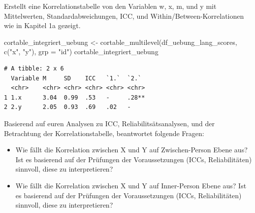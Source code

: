 \documentclass[
  letterpaper,
  DIV=11,
  numbers=noendperiod]{scrreprt}
\newenvironment{Shaded}{\begin{snugshade}}{\end{snugshade}}
\newcommand{\AttributeTok}[1]{\textcolor[rgb]{0.40,0.45,0.13}{#1}}
\newcommand{\FunctionTok}[1]{\textcolor[rgb]{0.28,0.35,0.67}{#1}}
\newcommand{\NormalTok}[1]{\textcolor[rgb]{0.00,0.23,0.31}{#1}}
\newcommand{\OtherTok}[1]{\textcolor[rgb]{0.00,0.23,0.31}{#1}}
\newcommand{\StringTok}[1]{\textcolor[rgb]{0.13,0.47,0.30}{#1}}
\providecommand{\tightlist}{%
  \setlength{\itemsep}{0pt}\setlength{\parskip}{0pt}}\usepackage{longtable,booktabs,array}
\begin{document}
Erstellt eine Korrelationstabelle von den Variablen w, x, m, und y mit
Mittelwerten, Standardabweichungen, ICC, und
Within/Between-Korrelationen wie in Kapitel 1a gezeigt.

\begin{tcolorbox}[enhanced jigsaw, bottomtitle=1mm, coltitle=black, titlerule=0mm, colbacktitle=quarto-callout-tip-color!10!white, colback=white, left=2mm, title=\textcolor{quarto-callout-tip-color}{\faLightbulb}\hspace{0.5em}{Lösung}, opacitybacktitle=0.6, arc=.35mm, leftrule=.75mm, toptitle=1mm, rightrule=.15mm, opacityback=0, bottomrule=.15mm, toprule=.15mm, colframe=quarto-callout-tip-color-frame, breakable]

\begin{Shaded}
\begin{Highlighting}[]
\NormalTok{cortable\_integriert\_uebung }\OtherTok{\textless{}{-}} \FunctionTok{cortable\_multilevel}\NormalTok{(df\_uebung\_lang\_scores, }\FunctionTok{c}\NormalTok{(}\StringTok{"x"}\NormalTok{, }\StringTok{"y"}\NormalTok{), }\AttributeTok{grp =} \StringTok{"id"}\NormalTok{)}
\NormalTok{cortable\_integriert\_uebung}
\end{Highlighting}
\end{Shaded}

\begin{verbatim}
# A tibble: 2 x 6
  Variable M     SD    ICC   `1.`  `2.` 
  <chr>    <chr> <chr> <chr> <chr> <chr>
1 1.x      3.04  0.99  .53   -     .28**
2 2.y      2.05  0.93  .69   .02   -    
\end{verbatim}

\end{tcolorbox}

Basierend auf euren Analysen zu ICC, Reliabilitsätsanalysen, und der
Betrachtung der Korrelationstabelle, beantwortet folgende Fragen:

\begin{itemize}
\tightlist
\item
  Wie fällt die Korrelation zwischen X und Y auf Zwischen-Person Ebene
  aus? Ist es basierend auf der Prüfungen der Voraussetzungen (ICCs,
  Reliabilitäten) sinnvoll, diese zu interpretieren?
\item
  Wie fällt die Korrelation zwischen X und Y auf Inner-Person Ebene aus?
  Ist es basierend auf der Prüfungen der Voraussetzungen (ICCs,
  Reliabilitäten) sinnvoll, diese zu interpretieren?
\end{itemize}
\end{document}
